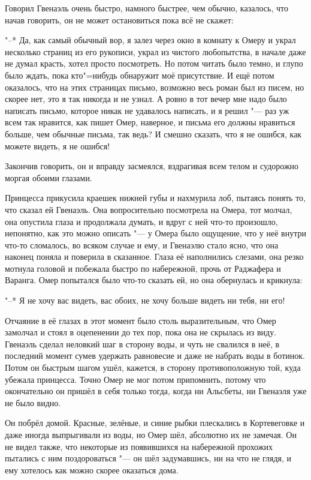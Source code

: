 Говорил Гвенаэль очень быстро, намного быстрее, чем обычно, казалось, что начав
говорить, он не может остановиться пока всё не скажет:

"--* Да, как самый обычный вор, я залез через окно в комнату к Омеру и украл
несколько страниц из его рукописи, украл из чистого любопытства, в начале даже не
думал красть, хотел просто посмотреть.
Но потом читать было темно, и глупо было ждать, пока кто"=нибудь обнаружит
моё присутствие.
И ещё потом оказалось, что на этих страницах письмо, возможно весь роман был из
писем, но скорее нет, это я так никогда и не узнал.
А ровно в тот вечер мне надо было написать письмо, которое никак не удавалось
написать, и я решил "--- раз уж всем так нравится, как пишет Омер, наверное, и
письма его должны нравиться больше, чем обычные письма, так ведь?
И смешно сказать, что я не ошибся, как можете видеть, я не ошибся!

Закончив говорить, он и вправду засмеялся, вздрагивая всем телом и судорожно
моргая обоими глазами.

Принцесса прикусила краешек нижней губы и нахмурила лоб, пытаясь понять то, что
сказал ей Гвенаэль.
Она вопросительно посмотрела на Омера, тот молчал, она опустила глаза и
продолжала думать, и вдруг с ней что-то произошло, непонятно, как это можно
описать "--- у Омера было ощущение, что у неё внутри что-то сломалось, во всяком
случае и ему, и Гвенаэлю стало ясно, что она наконец поняла и поверила в
сказанное.
Глаза её наполнились слезами, она резко мотнула головой и побежала быстро по
набережной, прочь от Раджафера и Варанга.
Омер попытался было что-то сказать ей, но она обернулась и крикнула:

"--* Я не хочу вас видеть, вас обоих, не хочу больше видеть ни тебя, ни его!

Отчаяние в её глазах в этот момент было столь выразительным, что Омер замолчал и
стоял в оцепенении до тех пор, пока она не скрылась из виду.
Гвенаэль сделал неловкий шаг в сторону воды, и чуть не свалился в неё, в
последний момент сумев удержать равновесие и даже не набрать воды в ботинок.
Потом он быстрым шагом ушёл, кажется, в сторону противоположную той, куда
убежала принцесса.
Точно Омер не мог потом припомнить, потому что окончательно он пришёл в себя
только тогда, когда ни Альсбеты, ни Гвенаэля уже не было видно.

Он побрёл домой.
Красные, зелёные, и синие рыбки плескались в Кортевеговке и даже иногда
выпрыгивали из воды, но Омер шёл, абсолютно их не замечая.
Он не видел также, что некоторые из появившихся на набережной прохожих пытались
с ним поздороваться "--- он шёл задумавшись, ни на что не глядя, и ему хотелось
как можно скорее оказаться дома.
